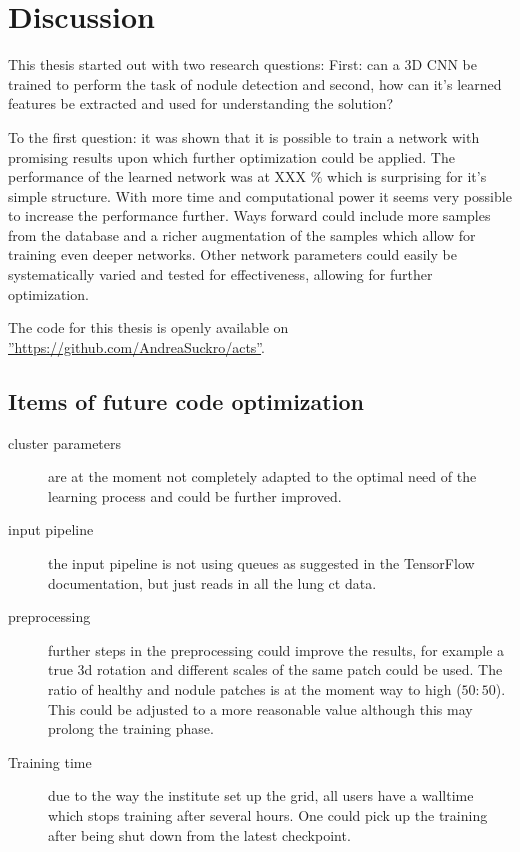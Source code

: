 \documentclass[main.tex]{subfiles}
\begin{document}
\chapter{Discussion}\label{chap:discussion}

This thesis started out with two research questions: First: can a 3D CNN be trained to perform the task of nodule detection and second, how can it's learned features be extracted and used for understanding the solution? 

To the first question: it was shown that it is possible to train a network with promising results upon which further optimization could be applied. The performance of the learned network was at XXX $\%$ which is surprising for it's simple structure. With more time and computational power it seems very possible to increase the performance further. Ways forward could include more samples from the database and a richer augmentation of the samples which allow for training even deeper networks. Other network parameters could easily be systematically varied and tested for effectiveness, allowing for further optimization.

The code for this thesis is openly available on \hyperref[GitHub]{''https://github.com/AndreaSuckro/acts''}. 

\section{Items of future code optimization}
\begin{description}
\item[cluster parameters] are at the moment not completely adapted to the optimal need of the learning process and could be further improved.
\item[input pipeline] the input pipeline is not using queues as suggested in the TensorFlow documentation, but just reads in all the lung ct data.
\item[preprocessing] further steps in the preprocessing could improve the results, for example a true 3d rotation and different scales of the same patch could be used. The ratio of healthy and nodule patches is at the moment way to high ($50:50$). This could be adjusted to a more reasonable value although this may prolong the training phase.
\item[Training time] due to the way the institute set up the grid, all users have a walltime which stops training after several hours. One could pick up the training after being shut down from the latest checkpoint.
\end{description}
\end{document}
